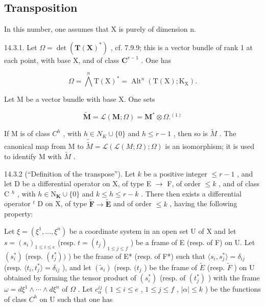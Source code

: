 \subsection{Transposition}

In this number, one assumes that X is purely of dimension n.

14.3.1. Let \(\Omega = \det(\mathbf{T}(\mathbf{X})^{*})\) , cf. 7.9.9; this is a vector bundle of rank 1 at each point, with base X, and of class \(\mathbf{C}^{r-1}\) . One has

\[
\Omega = \bigwedge^ {n} \mathrm{T} (\mathrm{X}) ^ {*} = \operatorname{Alt} ^ {n} (\mathrm{T} (\mathrm{X}); \mathrm{K} _ {\mathrm{X}}).
\]

Let M be a vector bundle with base X. One sets

\[
\tilde {\mathbf {M}} = \mathcal {L} (\mathbf {M}; \Omega) = \mathbf {M} ^ {*} \otimes \Omega . ^ {(1)}
\]

If M is of class \(C^{h}\) , with \(h \in N_{K} \cup \{0\}\) and \(h \leqslant r - 1\) , then so is \(\tilde{M}\) . The canonical map from M to \(\tilde{\tilde{M}} = \mathcal{L}(\mathcal{L}(M; \Omega); \Omega)\) is an isomorphism; it is used to identify M with \(\tilde{M}\) .

14.3.2 (“Definition of the transpose”). Let \(k\) be a positive integer \(\leqslant r - 1\) , and let D be a differential operator on X, of type E \(\rightarrow\) F, of order \(\leqslant k\) , and of class C \(^{h}\) , with \(h \in \mathrm{N}_{\mathbf{K}} \cup \{0\}\) and \(k \leqslant h \leqslant r - k\) . There then exists a differential operator \(^{t}\) D on X, of type \(\widetilde{\mathbf{F}} \to \widetilde{\mathbf{E}}\) and of order \(\leqslant k\) , having the following property:

Let \(\xi = (\xi^1, \ldots, \xi^n)\) be a coordinate system in an open set U of X and let \(s = (s_i)_{1 \leqslant i \leqslant e}\) (resp. \(t = (t_j)_{1 \leqslant j \leqslant f}\) ) be a frame of E (resp. of F) on U. Let \((s_i^*)\) (resp. \((t_j^*))\) ) be the frame of E* (resp. of F*) such that \(\langle s_i, s_j^* \rangle = \delta_{ij}\) (resp. \(\langle t_i, t_j^* \rangle = \delta_{ij}\) ), and let \((\tilde{s}_i)\) (resp. \((t_j\) ) be the frame of \(\tilde{E}\) (resp. \(\tilde{F}\) ) on U obtained by forming the tensor product of \((s_i^*)\) (resp. of \((t_j^*)\) ) with the frame \(\omega = d\xi^1 \wedge \cdots \wedge d\xi^n\) of \(\Omega\) . Let \(c_\alpha^{ij}\) ( \(1 \leqslant i \leqslant e\) , \(1 \leqslant j \leqslant f\) , \(|\alpha| \leqslant k\) ) be the functions of class \(C^h\) on U such that one has

